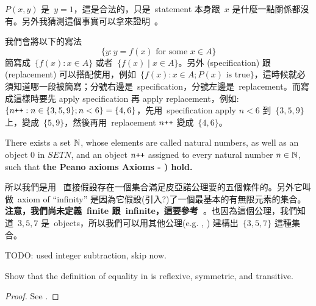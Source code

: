 \begin{note}
\(P(x, y)\) 是\ \(y = 1\)，這是合法的，只是\ statement 本身跟\ \(x\) 是什麼一點關係都沒有。另外我猜測這個事實可以拿來證明\ 。
\end{note}

\begin{note}
我們會將以下的寫法
\[
    \{y : y = f(x) \text{\ for some \(x \in A\)}\}
\]
簡寫成\ \( \{f(x): x \in A \} \) 或者\ \( \{f(x) \mid x \in A \} \)。另外  (specification) 跟  (replacement) 可以搭配使用，例如\ \(\{f(x) : x \in A; P(x) \text{\ is true}\} \)，這時候就必須知道哪一段被簡寫；分號右邊是\ specification，分號左邊是\ replacement。而寫成這樣時要先 apply specification 再 apply replacement，例如: \( \{n\texttt{++} : n \in \{3, 5, 9\}; n < 6 \} = \{4, 6\} \)，先用\ specification apply \(n < 6\) 到\ \(\{3, 5, 9\}\) 上，變成\  \(\{5, 9\}\)，然後再用\ replacement \(n\texttt{++}\) 變成\ \(\{4, 6\}\)。
\end{note}

\begin{axiom} [Infinity] \label{axm 3.7}
There exists a set \(\mathbb{N}\), whose elements are called natural numbers, as well as an object \(0\) in \(SET{N}\), and an object \(n\texttt{++}\) assigned to every natural number \(n \in \mathbb{N}\), such that \textbf{the Peano axioms Axioms  - ) hold.}
\end{axiom}

\begin{note}
所以我們是用\  直接假設存在一個集合滿足皮亞諾公理要的五個條件的。另外它叫做\ axiom of ``infinity'' 是因為它假設(引入?)了一個最基本的有無限元素的集合。\textbf{注意，我們尚未定義\ finite 跟\ infinite，這要參考\  }。也因為這個公理，我們知道\ \(3, 5, 7\) 是\ objects，所以我們可以用其他公理(e.g. , ) 建構出\ \( \{ 3, 5, 7 \}\) 這種集合。
\end{note}

\begin{example} \label{example 3.1.33}
TODO: used integer subtraction, skip now.
\end{example}

\exercisesection

\begin{exercise}\label{exercise 3.1.1}
Show that the definition of equality in  is reflexive, symmetric, and transitive.
\end{exercise}

\begin{proof}
See .
\end{proof}

